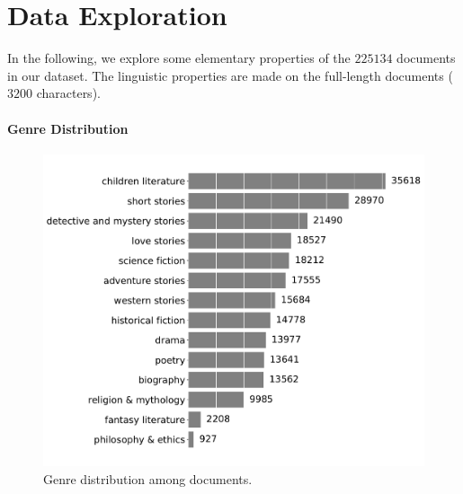 \chapter{Data Exploration}


In the following, we explore some elementary properties of the $225134$ documents in our dataset. The linguistic properties are made on the full-length documents ($3200$ characters).

\subsubsection{Genre Distribution}

\begin{figure}[h]
	\centering
	\includegraphics[height=0.4\textheight]{img/03_01_genre_distribution}
	\caption{Genre distribution among documents.}
	\label{fig:genre_distribution}
\end{figure}




